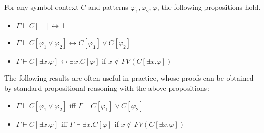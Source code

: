 \documentclass[acmsmall]{acmart}
\theoremstyle{acmdefinition}
\newcommand{\dimp}{\leftrightarrow}
\newcommand{\fv}{\mathit{FV}}
\newcommand{\FV}{\fv}
\begin{document}
\begin{proposition}
\label{prop_propgation_of_symbol_application}
For any symbol context $C$ and patterns $\varphi_1, \varphi_2, \varphi$,
the following propositions hold.
\begin{itemize}
	\item $\Gamma \vdash 
	          C[\bot] \dimp 
	          \bot$
	\item $\Gamma \vdash 
	          C[\varphi_1 \vee \varphi_2] \dimp
	          C[\varphi_1] \vee
	          C[\varphi_2]$
	\item $\Gamma \vdash
	          C[\exists x . \varphi] \dimp
	          \exists x . C[\varphi] $
	       \quad if $x \not\in \FV(C[\exists x . \varphi])$
\end{itemize}
The following results are often useful in practice, whose proofs can
be obtained by standard propositional reasoning with the above propositions:
\begin{itemize}
	\item $\Gamma \vdash 
	          C[\varphi_1 \vee \varphi_2]$
	      iff
	      $\Gamma \vdash C[\varphi_1] \vee
	                     C[\varphi_2]$
	\item $\Gamma \vdash
	          C[\exists x . \varphi] $
	      iff
	      $\Gamma \vdash \exists x . C[\varphi]$
	      \quad if $x \not\in \FV(C[\exists x . \varphi])$
\end{itemize}
\end{proposition}
\end{document}
